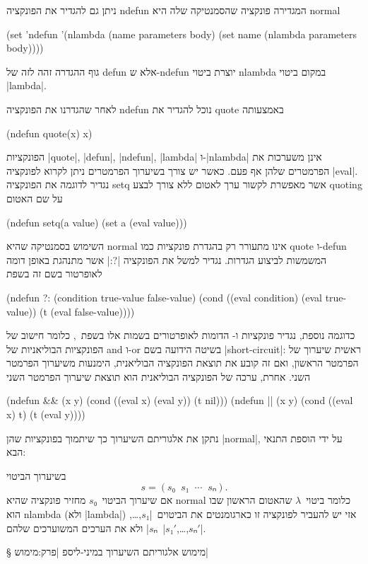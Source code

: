 ניתן גם להגדיר את הפונקציה ndefun המגדירה פונקציה שהסמנטיקה שלה היא normal
\begin{LIBRARY}
(set 'ndefun '(nlambda (name parameters body)
    (set name (nlambda parameters body))))
\end{LIBRARY}
גוף ההגדרה זהה לזה של defun אלא ש-ndefun יוצרת ביטוי nlambda במקום ביטוי
\E|lambda|.

לאחר שהגדרנו את הפונקציה ndefun נוכל להגדיר את quote באמצעותה
\begin{LISP}
(ndefun quote(x) x)
\end{LISP}
הפונקציות \E|quote|, \E|defun|, \E|ndefun|, \E|lambda| ו-\E|nlambda| אינן
משערכות את הפרמטרים שלהן אף פעם. כאשר יש צורך בשיערוך הפרמטרים ניתן לקרוא
לפונקציה \E|eval|. נגדיר לדוגמה את הפונקציה setq אשר מאפשרת לקשור ערך לאטום ללא
צורך לבצע quoting על שם האטום
\begin{LISP}
(ndefun setq(a value)
  (set a (eval value)))
\end{LISP}
השימוש בסמנטיקה שהיא normal אינו מתעורר רק בהגדרת פונקציות כמו quote ו-defun
המשמשות לביצוע הגדרות. נגדיר למשל את הפונקציה \T|?:| אשר מתנהגת באופן דומה
לאופרטור בשם זה בשפת~\CPL
\begin{LISP}
(ndefun ?: (condition true-value false-value)
  (cond ((eval condition) (eval true-value))
        (t (eval false-value))))
\end{LISP}
כדוגמה נוספת, נגדיר פונקציות \lisp{||} ו-\lisp{&&} הדומות לאופרטורים בשמות אלו
בשפת~\CPL, כלומר חישוב של הפונקציות הבוליאניות של and ו-or בשיטה הידועה בשם
\E|short-circuit|: ראשית שיערוך של הפרמטר הראשון, ואם זה קובע את תוצאת הפונקציה
הבוליאנית, הימנעות משיערוך הפרמטר השני. אחרת, ערכה של הפונקציה הבוליאנית הוא תוצאת
שיערוך הפרמטר השני
\begin{LISP}
(ndefun && (x y)
  (cond ((eval x) (eval y))
        (t nil)))
(ndefun || (x y)
  (cond ((eval x) t)
        (t (eval y))))
\end{LISP}

נתקן את אלגוריתם השיערוך כך שיתמוך בפונקציות שהן \E|normal|, על ידי הוספת התנאי
הבא:
\begin{mdframed}[backgroundcolor=Lavender!20]
  \footnotesize
  בשיערוך הביטוי \[
    s=(s₀\;\;s₁\;\;⋯\;\;sₙ).
\] אם שיערוך הביטוי~$s₀$ מחזיר פונקציה שהיא
  normal כלומר ביטוי~$λ$ שהאטום הראשון שבו הוא nlambda (ולא \E|lambda|) אזי יש
  להעביר לפונקציה זו כארגומנטים את הביטוים~\E|$s₁$,…,$sₙ$| ולא את הערכים
  המשוערכים שלהם~\E|$s₁'$,…,$sₙ'$|.
\end{mdframed}

§ מימוש אלגוריתם השיערוך במיני-ליספ
|פרק:מימוש|

